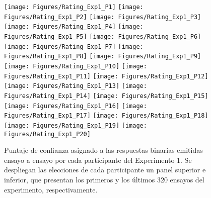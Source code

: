 \begin{figure}[th]
\centering
\texttt{[image: Figures/Rating\_Exp1\_P1]} \texttt{[image: Figures/Rating\_Exp1\_P2]} \texttt{[image: Figures/Rating\_Exp1\_P3]}
\texttt{[image: Figures/Rating\_Exp1\_P4]} \texttt{[image: Figures/Rating\_Exp1\_P5]} \texttt{[image: Figures/Rating\_Exp1\_P6]}
\texttt{[image: Figures/Rating\_Exp1\_P7]} \texttt{[image: Figures/Rating\_Exp1\_P8]} \texttt{[image: Figures/Rating\_Exp1\_P9]}
\texttt{[image: Figures/Rating\_Exp1\_P10]} \texttt{[image: Figures/Rating\_Exp1\_P11]} \texttt{[image: Figures/Rating\_Exp1\_P12]}
\texttt{[image: Figures/Rating\_Exp1\_P13]} \texttt{[image: Figures/Rating\_Exp1\_P14]} \texttt{[image: Figures/Rating\_Exp1\_P15]}
\texttt{[image: Figures/Rating\_Exp1\_P16]} \texttt{[image: Figures/Rating\_Exp1\_P17]} \texttt{[image: Figures/Rating\_Exp1\_P18]}
\texttt{[image: Figures/Rating\_Exp1\_P19]} \texttt{[image: Figures/Rating\_Exp1\_P20]} 
\caption[Puntajes de Confianza asignados ensayo a ensayo; Experimento 1]{Puntaje de confianza asignado a las respuestas binarias emitidas ensayo a ensayo por cada participante del Experimento 1. Se despliegan las elecciones de cada participante un panel superior e inferior, que presentan los primeros y los últimos 320 ensayos del experimento, respectivamente.}
\label{fig:Rating_E1}
\end{figure}

